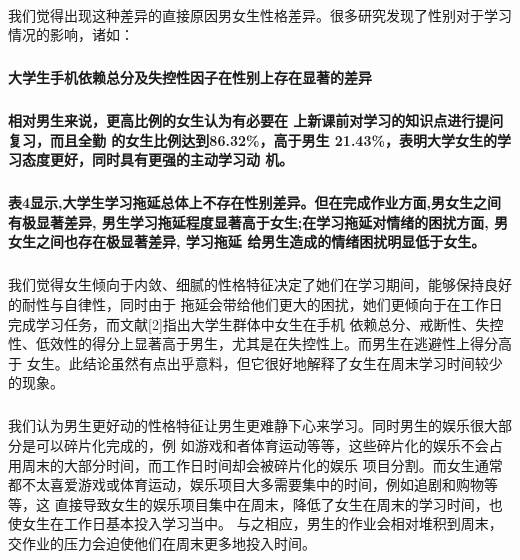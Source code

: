 \documentclass[UTF8]{ctexart}
\begin{document}
\paragraph{}
我们觉得出现这种差异的直接原因男女生性格差异。很多研究发现了性别对于学习情况的影响，诸如：
\subparagraph*{}
\textbf{大学生手机依赖总分及失控性因子在性别上存在显著的差异\cite{phone}}
\subparagraph*{}
\textbf{相对男生来说，更高比例的女生认为有必要在 上新课前对学习的知识点进行提问复习，而且全勤
的女生比例达到86.32\%，高于男生 21.43\%，表明大学女生的学习态度更好，同时具有更强的主动学习动
机。\cite{genderdifference}}
\subparagraph*{}
\textbf{表4显示,大学生学习拖延总体上不存在性别差异。但在完成作业方面,男女生之间有极显著差异,
男生学习拖延程度显著高于女生;在学习拖延对情绪的困扰方面, 男女生之间也存在极显著差异, 学习拖延
给男生造成的情绪困扰明显低于女生\cite{delay}。}
\subparagraph*{}
我们觉得女生倾向于内敛、细腻的性格特征决定了她们在学习期间，能够保持良好的耐性与自律性，同时由于
拖延会带给他们更大的困扰，她们更倾向于在工作日完成学习任务，而文献[2]指出大学生群体中女生在手机
依赖总分、戒断性、失控性、低效性的得分上显著高于男生，尤其是在失控性上。而男生在逃避性上得分高于
女生\cite{phone}。此结论虽然有点出乎意料，但它很好地解释了女生在周末学习时间较少的现象。
\subparagraph*{}
我们认为男生更好动的性格特征让男生更难静下心来学习。同时男生的娱乐很大部分是可以碎片化完成的，例
如游戏和者体育运动等等，这些碎片化的娱乐不会占用周末的大部分时间，而工作日时间却会被碎片化的娱乐
项目分割。而女生通常都不太喜爱游戏或体育运动，娱乐项目大多需要集中的时间，例如追剧和购物等等，这
直接导致女生的娱乐项目集中在周末，降低了女生在周末的学习时间，也使女生在工作日基本投入学习当中。
与之相应，男生的作业会相对堆积到周末，交作业的压力会迫使他们在周末更多地投入时间。
\end{document}
